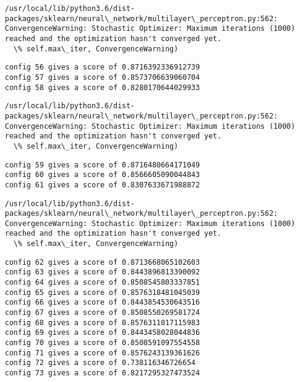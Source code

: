 \documentclass[11pt]{article}
\begin{document}
    \begin{Verbatim}[commandchars=\\\{\}]
/usr/local/lib/python3.6/dist-packages/sklearn/neural\_network/multilayer\_perceptron.py:562: ConvergenceWarning: Stochastic Optimizer: Maximum iterations (1000) reached and the optimization hasn't converged yet.
  \% self.max\_iter, ConvergenceWarning)

    \end{Verbatim}

    \begin{Verbatim}[commandchars=\\\{\}]
config 56 gives a score of 0.8716392336912739
config 57 gives a score of 0.8573706639060704
config 58 gives a score of 0.8280170644029933

    \end{Verbatim}

    \begin{Verbatim}[commandchars=\\\{\}]
/usr/local/lib/python3.6/dist-packages/sklearn/neural\_network/multilayer\_perceptron.py:562: ConvergenceWarning: Stochastic Optimizer: Maximum iterations (1000) reached and the optimization hasn't converged yet.
  \% self.max\_iter, ConvergenceWarning)

    \end{Verbatim}

    \begin{Verbatim}[commandchars=\\\{\}]
config 59 gives a score of 0.8716480664171049
config 60 gives a score of 0.8566605090044843
config 61 gives a score of 0.8307633671988872

    \end{Verbatim}

    \begin{Verbatim}[commandchars=\\\{\}]
/usr/local/lib/python3.6/dist-packages/sklearn/neural\_network/multilayer\_perceptron.py:562: ConvergenceWarning: Stochastic Optimizer: Maximum iterations (1000) reached and the optimization hasn't converged yet.
  \% self.max\_iter, ConvergenceWarning)

    \end{Verbatim}

    \begin{Verbatim}[commandchars=\\\{\}]
config 62 gives a score of 0.8713668065102603
config 63 gives a score of 0.8443896813390092
config 64 gives a score of 0.8508545803337851
config 65 gives a score of 0.8576318481045039
config 66 gives a score of 0.8443854530643516
config 67 gives a score of 0.8508550269581724
config 68 gives a score of 0.8576311017115983
config 69 gives a score of 0.8443458028044836
config 70 gives a score of 0.8508591097554558
config 71 gives a score of 0.8576243139361626
config 72 gives a score of 0.738116346726654
config 73 gives a score of 0.8217295327473524

    \end{Verbatim}
\end{document}
